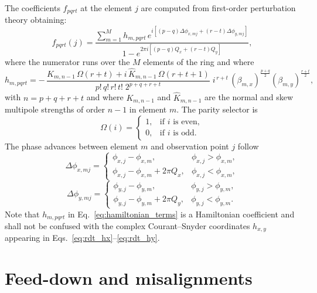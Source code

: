 The coefficients $f_{pqrt}$ at the element $j$ are computed from first-order perturbation theory
obtaining:
\begin{equation}
f_{pqrt}(j) = \frac{\displaystyle \sum_{m=1}^{M} h_{m,pqrt}\, e^{i\left[(p-q)\Delta\phi_{x,mj} + (r-t)\Delta\phi_{y,mj}\right]}}{1 - e^{2\pi i\left[(p-q)Q_x + (r-t)Q_y\right]}},
\label{eq:rdt_def}
\end{equation}
where the numerator runs over the $M$ elements of the ring and where
\begin{equation}
h_{m,pqrt} = -\,\frac{K_{m,n-1}\,\Omega(r+t) + i\, \hat{K}_{m,n-1}\,\Omega(r+t+1)}{p!\,q!\,r!\,t!\; 2^{p+q+r+t}}\;
i^{\,r+t}\, (\beta_{m,x})^{\frac{p+q}{2}} (\beta_{m,y})^{\frac{r+t}{2}},
\label{eq:hamiltonian_terms}
\end{equation}
with $n = p+q+r+t$ and where $K_{m,n-1}$ and $\hat{K}_{m,n-1}$ are the normal and skew multipole strengths of order $n-1$ in element $m$. The parity selector is
\begin{equation}
\Omega(i)=
\begin{cases}
1, & \text{if $i$ is even},\\
0, & \text{if $i$ is odd}.
\end{cases}
\end{equation}
The phase advances between element $m$ and observation point $j$ follow
\begin{equation}
\Delta\phi_{x,mj} =
\begin{cases}
\phi_{x,j} - \phi_{x,m}, & \phi_{x,j} > \phi_{x,m},\\
\phi_{x,j} - \phi_{x,m} + 2\pi Q_x, & \phi_{x,j} < \phi_{x,m},
\end{cases}
\end{equation}
\begin{equation}
\Delta\phi_{y,mj} =
\begin{cases}
\phi_{y,j} - \phi_{y,m}, & \phi_{y,j} > \phi_{y,m},\\
\phi_{y,j} - \phi_{y,m} + 2\pi Q_y, & \phi_{y,j} < \phi_{y,m}.
\end{cases}
\end{equation}
Note that $h_{m,pqrt}$ in Eq.~\eqref{eq:hamiltonian_terms} is a Hamiltonian coefficient and shall not be confused with the complex Courant--Snyder coordinates $h_{x,y}$ appearing in Eqs.~\eqref{eq:rdt_hx}--\eqref{eq:rdt_hy}.

\section{Feed-down and misalignments}

